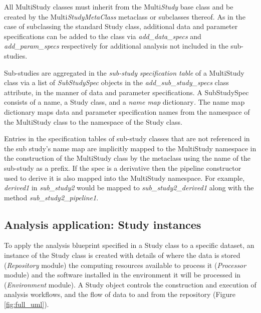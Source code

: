 \documentclass[smallextended]{svjour3}       %
\begin{document}
All MultiStudy classes must inherit from the Multi\emph{Study} base
class and be created by the Multi\emph{StudyMetaClass} metaclass or
subclasses thereof. As in the case of subclassing the standard Study
class, additional data and parameter specifications can be added to the
class via \emph{add\_data\_specs} and \emph{add\_param\_specs}
respectively for additional analysis not included in the sub-studies.

Sub-studies are aggregated in the \emph{sub-study} \emph{specification
table} of a MultiStudy class via a list of \emph{SubStudySpec} objects
in the \emph{add\_sub\_study\_specs} class attribute, in the manner of
data and parameter specifications. A SubStudySpec consists of a name, a
Study class, and a \emph{name map} dictionary\emph{.} The name map
dictionary maps data and parameter specification names from the
namespace of the MultiStudy class to the namespace of the Study class.

Entries in the specification tables of sub-study classes that are not
referenced in the sub study's name map are implicitly mapped to the
MultiStudy namespace in the construction of the MultiStudy class by the
metaclass using the name of the sub-study as a prefix. If the spec is a
derivative then the pipeline constructor used to derive it is also
mapped into the MultiStudy namespace. For example, \emph{derived1} in
\emph{sub\_study2} would be mapped to \emph{sub\_study2\_derived1} along
with the method \emph{sub\_study2\_pipeline1}.

\subsection*{Analysis application: Study instances}
\label{analysis-application-study-instances}

To apply the analysis blueprint specified in a Study class to a specific
dataset, an instance of the Study class is created with details of where
the data is stored (\emph{Repository} module) the computing
resources available to process it (\emph{Processor} module) and the software
installed in the environment it will be processed in (\emph{Environment} module).
A Study object controls the construction and execution of analysis workflows,
and the flow of data to and from the repository (Figure \ref{fig:full_uml}).
\end{document}
